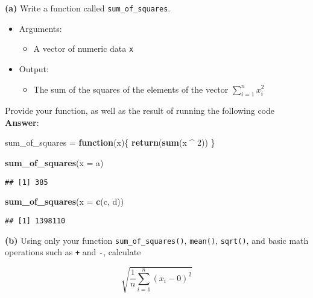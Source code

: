 \documentclass[]{article}
\newenvironment{Shaded}{\begin{snugshade}}{\end{snugshade}}
\newcommand{\KeywordTok}[1]{\textcolor[rgb]{0.13,0.29,0.53}{\textbf{#1}}}
\newcommand{\DataTypeTok}[1]{\textcolor[rgb]{0.13,0.29,0.53}{#1}}
\newcommand{\DecValTok}[1]{\textcolor[rgb]{0.00,0.00,0.81}{#1}}
\newcommand{\StringTok}[1]{\textcolor[rgb]{0.31,0.60,0.02}{#1}}
\newcommand{\ControlFlowTok}[1]{\textcolor[rgb]{0.13,0.29,0.53}{\textbf{#1}}}
\newcommand{\OperatorTok}[1]{\textcolor[rgb]{0.81,0.36,0.00}{\textbf{#1}}}
\newcommand{\NormalTok}[1]{#1}
\providecommand{\tightlist}{%
  \setlength{\itemsep}{0pt}\setlength{\parskip}{0pt}}
\begin{document}
\textbf{(a)} Write a function called \texttt{sum\_of\_squares}.

\begin{itemize}
\tightlist
\item
  Arguments:

  \begin{itemize}
  \tightlist
  \item
    A vector of numeric data \texttt{x}
  \end{itemize}
\item
  Output:

  \begin{itemize}
  \tightlist
  \item
    The sum of the squares of the elements of the vector
    \(\sum_{i = 1}^n x_i^2\)
  \end{itemize}
\end{itemize}

Provide your function, as well as the result of running the following
code \textbf{Answer}:

\begin{Shaded}
\begin{Highlighting}[]
\NormalTok{sum_of_squares =}\StringTok{ }\ControlFlowTok{function}\NormalTok{(x)\{}
  \KeywordTok{return}\NormalTok{(}\KeywordTok{sum}\NormalTok{(x }\OperatorTok{^}\StringTok{ }\DecValTok{2}\NormalTok{))}
\NormalTok{\}}

\KeywordTok{sum_of_squares}\NormalTok{(}\DataTypeTok{x =}\NormalTok{ a)}
\end{Highlighting}
\end{Shaded}

\begin{verbatim}
## [1] 385
\end{verbatim}

\begin{Shaded}
\begin{Highlighting}[]
\KeywordTok{sum_of_squares}\NormalTok{(}\DataTypeTok{x =} \KeywordTok{c}\NormalTok{(c, d))}
\end{Highlighting}
\end{Shaded}

\begin{verbatim}
## [1] 1398110
\end{verbatim}

\textbf{(b)} Using only your function \texttt{sum\_of\_squares()},
\texttt{mean()}, \texttt{sqrt()}, and basic math operations such as
\texttt{+} and \texttt{-}, calculate

\[
\sqrt{\frac{1}{n}\sum_{i = 1}^n (x_i - 0)^{2}}
\]
\end{document}
